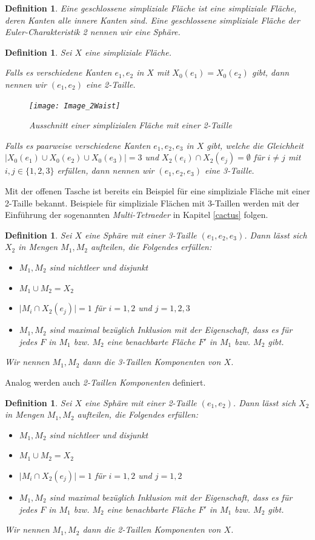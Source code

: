\documentclass[12pt,titlepage,twoside,cleardoublepage]{article}
\theoremstyle{nummermitklammern}
\newtheorem{definition}[temp]{Definition}
\newtheorem{definition}[zahl]{Definition}
\numberwithin{equation}{section}
\begin{document}
\begin{definition}  Eine \emph{geschlossene} simpliziale Fläche ist eine simpliziale Fläche, deren Kanten alle innere Kanten sind. Eine geschlossene simpliziale Fläche der Euler-Charakteristik  2 nennen wir eine \emph{Sphäre}.
\end{definition} 

\begin{definition}
Sei $X$ eine simpliziale Fläche.

 Falls es verschiedene Kanten $e_1,e_2$ in $X$ mit $X_0(e_1)=X_0(e_2)$ gibt, dann nennen wir $(e_1,e_2)$ eine 2-Taille.
 \begin{figure}[H]
\begin{center}
\texttt{[image: Image\_2Waist]}
\end{center}
\caption{Ausschnitt einer simplizialen Fläche mit einer 2-Taille}
\end{figure} 
 Falls es paarweise verschiedene Kanten $e_1,e_2,e_3$ in $X$ gibt, welche die Gleichheit $\vert X_0(e_1)\cup X_0(e_2)\cup X_0(e_3) \vert=3$ und $X_2(e_i)\cap X_2(e_j)=\emptyset$ für $i \neq j$ mit $i,j\in\{1,2,3\}  $ erfüllen, dann nennen wir $(e_1,e_2,e_3)$ eine 3-Taille. 
\end{definition}
Mit der offenen Tasche ist bereits ein Beispiel für eine simpliziale Fläche mit einer 2-Taille bekannt. Beispiele für simpliziale Flächen mit 3-Taillen werden mit der Einführung der sogenannten \emph{Multi-Tetraeder} in Kapitel \ref{cactus} folgen. 
\begin{definition} \label{2waistk}
Sei $X$ eine Sphäre mit einer 3-Taille $(e_1,e_2,e_3)$. Dann lässt sich $X_2$ in  Mengen $M_1,M_2$ aufteilen, die Folgendes erfüllen:
\begin{itemize}
\item $M_1,M_2$ sind nichtleer und disjunkt
\item $M_1\cup M_2=X_2$
\item $\vert M_i \cap X_2(e_j)\vert =1$ für $i=1,2$ und $j=1,2,3$
\item $M_1,M_2$ sind maximal bezüglich Inklusion mit der Eigenschaft, dass es für jedes $F$ in $M_1$ bzw. $M_2$ eine benachbarte Fläche $F'$ in $M_1$ bzw. $M_2$ gibt.
\end{itemize}  
Wir nennen $M_1,M_2$ dann die \emph{3-Taillen Komponenten} von $X$. 
\end{definition}
Analog werden auch \emph{2-Taillen Komponenten} definiert.
\begin{definition}
Sei $X$ eine Sphäre mit einer 2-Taille $(e_1,e_2)$. Dann lässt sich $X_2$ in  Mengen $M_1,M_2$ aufteilen, die Folgendes erfüllen:
\begin{itemize}
\item $M_1,M_2$ sind nichtleer und disjunkt
\item $M_1\cup M_2=X_2$
\item $\vert M_i \cap X_2(e_j)\vert =1$ für $i=1,2$ und $j=1,2$
\item $M_1,M_2$ sind maximal bezüglich Inklusion mit der Eigenschaft, dass es für jedes $F$ in $M_1$ bzw. $M_2$ eine benachbarte Fläche $F'$ in $M_1$ bzw. $M_2$ gibt.
\end{itemize}  
 Wir nennen $M_1,M_2$ dann die \emph{2-Taillen Komponenten} von $X$. 
\end{definition}
\end{document}
